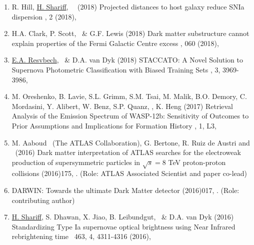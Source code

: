 \begin{enumerate}
\item 
\paper
{R. Hill, \ul{H. Shariff}, \rt\ \etal\ (2018)}
{Projected distances to host galaxy reduce SNIa dispersion}
{, 2 (2018), }

\item 
\paper
{H.A. Clark, P. Scott, \rt\ \& G.F. Lewis (2018)}	
{Dark matter substructure cannot explain properties of the Fermi Galactic Centre excess}
{, 060 (2018), }

\item 
\paper
{\ul{E.A. Resvbech}, \rt\ \& D.A. van Dyk (2018)}
{STACCATO: A Novel Solution to Supernova Photometric Classification with Biased Training Sets}
{,  3, 3969-3986, \\ }

\item
\paper
{M. Oreshenko, B. Lavie, S.L. Grimm, S.M. Tsai, M. Malik, B.O. Demory, C. Mordasini, Y. Alibert, W. Benz, S.P. Quanz, \rt, K. Heng (2017)}
{Retrieval Analysis of the Emission Spectrum of WASP-12b: Sensitivity of Outcomes to Prior Assumptions and Implications for Formation History}
{, 1, L3, }

\item 
\paper
{M. Aaboud \etal\ (The ATLAS Collaboration), G. Bertone, R. Ruiz de Austri and \rt\ (2016)}
{Dark matter interpretation of ATLAS searches for the electroweak production of supersymmetric particles in $\sqrt{s} = 8$ TeV proton-proton collisions}
{(2016)175,  . (Role: ATLAS Associated Scientist and paper co-lead)}

\item 
\threestars {}
{DARWIN: Towards the ultimate Dark Matter detector}
{(2016)017, . (Role: contributing author)}

\item 
\paper
{\ul{H. Shariff}, S. Dhawan, X. Jiao, B. Leibundgut, \rt\ \& D.A. van Dyk  (2016)}
{Standardizing Type Ia supernovae optical brightness using Near Infrared rebrightening time}
{\mnras\ 463, 4, 4311-4316 (2016), }


\end{enumerate}
